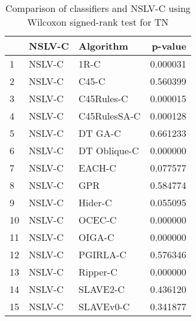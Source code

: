 \begin{table}
\footnotesize
\caption{Comparison of classifiers and NSLV-C using Wilcoxon signed-rank test for TN}
\label{tab:NSLV-C wilcoxon TN comparison}
\begin{tabular}{lllr}
\hline
 & NSLV-C & Algorithm & p-value \\
\hline
1 & NSLV-C & 1R-C & 0.000031 \\
2 & NSLV-C & C45-C & 0.560399 \\
3 & NSLV-C & C45Rules-C & 0.000015 \\
4 & NSLV-C & C45RulesSA-C & 0.000128 \\
5 & NSLV-C & DT GA-C & 0.661233 \\
6 & NSLV-C & DT Oblique-C & 0.000000 \\
7 & NSLV-C & EACH-C & 0.077577 \\
8 & NSLV-C & GPR & 0.584774 \\
9 & NSLV-C & Hider-C & 0.055095 \\
10 & NSLV-C & OCEC-C & 0.000000 \\
11 & NSLV-C & OIGA-C & 0.000000 \\
12 & NSLV-C & PGIRLA-C & 0.576346 \\
13 & NSLV-C & Ripper-C & 0.000000 \\
14 & NSLV-C & SLAVE2-C & 0.436120 \\
15 & NSLV-C & SLAVEv0-C & 0.341877 \\
\hline
\end{tabular}
\end{table}
